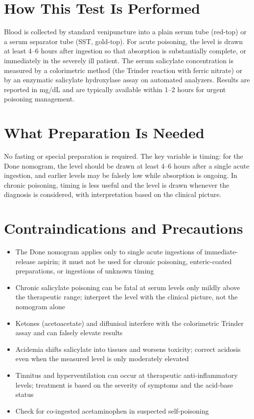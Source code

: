 \section*{How This Test Is Performed}
Blood is collected by standard venipuncture into a plain serum tube (red-top) or a serum separator tube (SST, gold-top). For acute poisoning, the level is drawn at least 4--6 hours after ingestion so that absorption is substantially complete, or immediately in the severely ill patient. The serum salicylate concentration is measured by a colorimetric method (the Trinder reaction with ferric nitrate) or by an enzymatic salicylate hydroxylase assay on automated analyzers. Results are reported in mg/dL and are typically available within 1--2 hours for urgent poisoning management.
\section*{What Preparation Is Needed}
No fasting or special preparation is required. The key variable is timing: for the Done nomogram, the level should be drawn at least 4--6 hours after a single acute ingestion, and earlier levels may be falsely low while absorption is ongoing. In chronic poisoning, timing is less useful and the level is drawn whenever the diagnosis is considered, with interpretation based on the clinical picture.
\section*{Contraindications and Precautions}
\begin{itemize}
  \item The Done nomogram applies only to single acute ingestions of immediate-release aspirin; it must not be used for chronic poisoning, enteric-coated preparations, or ingestions of unknown timing
  \item Chronic salicylate poisoning can be fatal at serum levels only mildly above the therapeutic range; interpret the level with the clinical picture, not the nomogram alone
  \item Ketones (acetoacetate) and diflunisal interfere with the colorimetric Trinder assay and can falsely elevate results
  \item Acidemia shifts salicylate into tissues and worsens toxicity; correct acidosis even when the measured level is only moderately elevated
  \item Tinnitus and hyperventilation can occur at therapeutic anti-inflammatory levels; treatment is based on the severity of symptoms and the acid-base status
  \item Check for co-ingested acetaminophen in suspected self-poisoning
\end{itemize}
